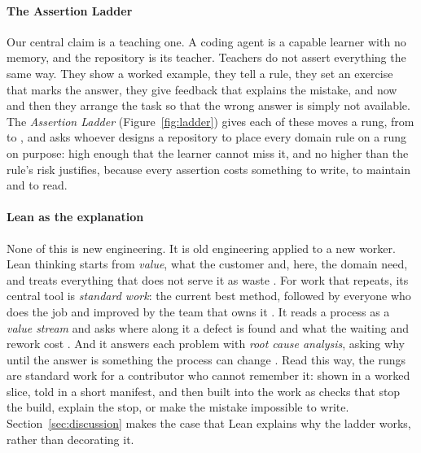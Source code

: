 \paragraph{The Assertion Ladder} Our central claim is a teaching one. A coding agent is a
capable learner with no memory, and the repository is its teacher. Teachers do not assert
everything the same way. They show a worked example, they tell a rule, they set an exercise that
marks the answer, they give feedback that explains the mistake, and now and then they arrange
the task so that the wrong answer is simply not available. The \emph{Assertion Ladder}
(Figure~\ref{fig:ladder}) gives each of these moves a rung, from  to
, and asks whoever designs a repository to place every domain rule on a rung
on purpose: high enough that the learner cannot miss it, and no higher than the rule's risk
justifies, because every assertion costs something to write, to maintain and to read.

\paragraph{Lean as the explanation} None of this is new engineering. It is old engineering
applied to a new worker. Lean thinking starts from \emph{value}, what the customer and, here,
the domain need, and treats everything that does not serve it as waste
\citep{womack1996lean,poppendieck2006implementing}. For work that repeats, its central tool is
\emph{standard work}: the current best method, followed by everyone who does the job and
improved by the team that owns it \citep{liker2004toyota}. It reads a process as a \emph{value
stream} and asks where along it a defect is found and what the waiting and rework cost
\citep{rother1999learning}. And it answers each problem with \emph{root cause analysis}, asking
why until the answer is something the process can change \citep{ohno1988tps}. Read this way,
the rungs are standard work for a contributor who cannot remember it: shown in a worked slice,
told in a short manifest, and then built into the work as checks that stop the build, explain
the stop, or make the mistake impossible to write. Section~\ref{sec:discussion} makes the case
that Lean explains why the ladder works, rather than decorating it.

